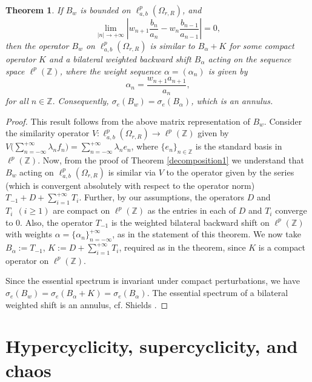 \documentclass[12pt, reqno]{amsart}
\newtheorem{theorem}{Theorem}[section]
\theoremstyle{definition}
\theoremstyle{remark}
\numberwithin{equation}{section}
\begin{document}
\begin{theorem}\label{prop}
If $B_w$ is bounded on $\ell^p_{a,b}(\Omega_{r,R})$, and
\[
\lim_{ |n| \rightarrow +\infty} \left\lvert w_{n+1}\frac{b_{n}}{a_{n}}-w_{n}\frac{b_{n-1}}{a_{n-1}}\right\rvert=0 ,
\]
then the operator $B_{w}$ on $\ell^{p}_{{a},{b}}(\Omega_{r,R})$ is similar to $B_{\alpha}+K$ for some compact operator $K$ and a bilateral weighted backward shift $B_{\alpha}$ acting on the sequence space $\ell^p(\mathbb{Z})$, where the weight sequence $\alpha=(\alpha_n)$ is given by 
\[
\alpha_n=\frac{ w_{n+1}a_{n+1}}{a_{n}}, 
\]
for all $n\in \mathbb{Z}.$ Consequently, $\sigma_e(B_w)=\sigma_e(B_{\alpha})$, which is an annulus.
 \end{theorem}

 \begin{proof}
     This result follows from the above matrix representation of $B_{w}$. Consider the similarity operator $V:\ell^{p}_{a,b}(\Omega_{r,R})\rightarrow \ell^p(\mathbb{Z})$ given by $V\big(\sum_{n=-\infty}^{+\infty} \lambda_n f_n\big)=\sum_{n=-\infty}^{+\infty}\lambda_ne_n$, where $\{e_n\}_{n\in \mathbb{Z}}$ is the standard basis in $\ell^p(\mathbb{Z})$. Now, from the proof of Theorem \ref{decomposition1} we understand that $B_{w}$ acting on $\ell^{p}_{a,b}(\Omega_{r,R})$ is similar via $V$ to the operator given by the series (which is convergent absolutely with respect to the operator norm)
     $       T_{-1}+D+\sum_{i=1}^{+\infty}T_i.
     $
     Further, by our assumptions, the operators $D$ and $T_i~~(i\geq 1)$ are compact on $\ell^p(\mathbb{Z})$ as the entries in each of $D$ and $T_i$ converge to $0$. Also, the operator $T_{-1}$ is the weighted bilateral backward shift on $\ell^p(\mathbb{Z})$ with weights $\alpha=\{\alpha_n\}_{n=-\infty}^{+\infty}$, as in the statement of this theorem. We now take $B_{\alpha}:=T_{-1}$,  $K:=D+\displaystyle\sum_{i=1}^{+\infty}T_i$, required as in the theorem, since $K$ is a compact operator on $\ell^p(\mathbb{Z})$. 

Since the essential spectrum is invariant under compact perturbations, we have $\sigma_e(B_w)=\sigma_e(B_{\alpha}+K)=\sigma_e(B_{\alpha})$. The essential spectrum of a bilateral weighted shift is an annulus, cf. Shields \cite{Shields}.
 \end{proof}
 

\section{Hypercyclicity, supercyclicity, and chaos}
\end{document}
